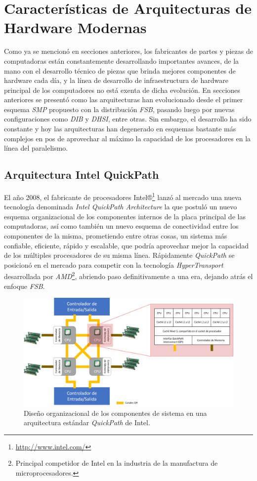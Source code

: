 \section{Características de Arquitecturas de Hardware Modernas}
Como ya se mencionó en secciones anteriores, los fabricantes de partes y piezas de computadoras están constantemente desarrollando importantes avances, de la mano con el desarrollo técnico de piezas que brinda mejores componentes de hardware cada día, y la línea de desarrollo de infraestructura de hardware principal de los computadores no está exenta de dicha evolución. En secciones anteriores se presentó como las arquitecturas han evolucionado desde el primer esquema \emph{SMP} propuesto con la distribución \emph{FSB}, pasando luego por nuevas configuraciones como \emph{DIB} y \emph{DHSI}, entre otras. Sin embargo, el desarrollo ha sido constante y hoy las arquitecturas han degenerado en esquemas bastante más complejos en pos de aprovechar al máximo la capacidad de los procesadores en la línea del paralelismo.

\subsection{Arquitectura Intel QuickPath}
El año 2008, el fabricante de procesadores Intel®\footnote{\url{http://www.intel.com/}} lanzó al mercado una nueva tecnología denominada \emph{Intel QuickPath Architecture} \cite{paper:quickpath} la que postuló un nuevo esquema organizacional de los componentes internos de la placa principal de las computadoras, así como también un nuevo esquema de conectividad entre los componentes de la misma, prometiendo entre otras cosas, un sistema más confiable, eficiente, rápido y escalable, que podría aprovechar mejor la capacidad de los múltiples procesadores de su misma línea. Rápidamente \emph{QuickPath} se posicionó en el mercado para competir con la tecnología \emph{HyperTransport} desarrollada por \emph{AMD}\footnote{Principal competidor de Intel en la industria de la manufactura de microprocesadores.}, abriendo paso definitivamente a una era, dejando atrás el enfoque \emph{FSB}.

\begin{figure}[!h]
	\centering
	\includegraphics[scale=.5]{imagenes/quickpath2.png}
	\caption{Diseño organizacional de los componentes de sistema en una arquitectura estándar \emph{QuickPath} de Intel.}
	\label{fig:quickpath}
\end{figure}

